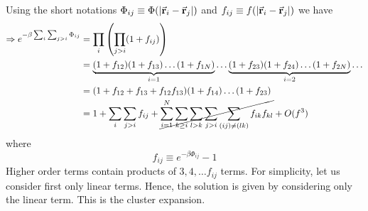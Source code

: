 \documentclass[../main/main.tex]{subfiles}
\begin{document}
 Using the short notations \(   \Phi _{ij} \equiv \Phi (\abs{\va{r}_i - \va{r}_j} ) \) and \( f_{ij} \equiv f (\abs{\va{r}_i - \va{r}_j} ) \) we have
\begin{equation*}
\begin{split}
  \Rightarrow e^{-\beta \sum_{i}^{}  \sum_{j>i}^{} \Phi _{ij}  } &= \prod_{i}^{} \qty(\prod_{j>i}^{} (1+ f_{ij})  ) \\
  & = \underbrace{(1+f_{12})(1+f_{13})  \dots ( 1 + f_{1N })}_{i=1}   \dots \underbrace{(1+f_{23}) (1+ f_{24}) \dots ( 1 + f_{2N })}_{i=2} \dots \\
  & = (1 + f_{12} + f_{13} + f_{12}f_{13}) (1+f_{14}) \dots(1+f_{23}) \\
  & = 1 + \sum_{i}^{} \sum_{j>i}^{} f_{ij} + \cancel{\sum_{i=1}^{N} \sum_{k \ge i}^{} \sum_{l > k}^{} \sum_{j > i }^{} \sum_{(ij) \neq (lk)}^{}  f_{ik} f_{kl}       } + O (f^3)
\end{split}
\end{equation*}
where
\begin{equation*}
  f_{ij} \equiv  e^{-\beta \Phi _{ij}} -1
\end{equation*}
Higher order terms contain products of \( 3,4,\dots f_{ij} \) terms. For simplicity, let us consider first only linear terms. Hence, the solution is given by considering only the linear term. This is the cluster expansion.
\end{document}
